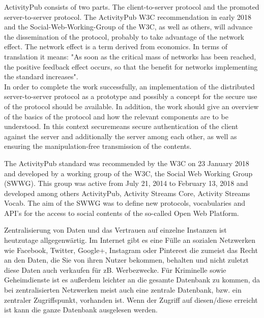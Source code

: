 {	ActivityPub consists of two parts. The client-to-server protocol and the promoted server-to-server protocol. The ActivityPub W3C recommendation in early 2018 and the Social-Web-Working-Group of the W3C, as well as others, will advance the dissemination of the protocol, probably to take advantage of the network effect. The network effect is a term derived from economics. In terms of translation it means: "As soon as the critical mass of networks has been reached, the positive feedback effect occurs, so that the benefit for networks implementing the standard increases".\\
	
	In order to complete the work successfully, an implementation of the distributed server-to-server protocol as a prototype and possibly a concept for the secure use of the protocol should be available. In addition, the work should give an overview of the basics of the protocol and how the relevant components are to be understood. In this context \glqq secure\grqq means secure authentication of the client against the server and additionally the server among each other, as well as ensuring the manipulation-free transmission of the contents.\\
	
	
	The ActivityPub\cite{activityPub} standard was recommended by the W3C on 23 January 2018 and developed by a working group of the W3C, the Social Web Working Group (SWWG)\cite{socialWg,pushSocialWeb}. This group was active from July 21, 2014 to February 13, 2018\cite{socialWg} and developed among others ActivityPub, Activity Streams Core\cite{activityStreamsCore}, Activity Streams Vocab\cite{activityStreamsVocabulary}. The aim of the SWWG was to define new protocols, vocabularies and API's for the access to social contents of the so-called Open Web Platform\cite{social-wg-charter}.

}{
	Zentralisierung von Daten und das Vertrauen auf einzelne Instanzen ist heutzutage allgegenwärtig. Im Internet gibt es eine Fülle an sozialen Netzwerken wie Facebook, Twitter, Google+, Instagram oder Pinterest die zumeist das Recht an den Daten, die Sie von ihren Nutzer bekommen, behalten und nicht zuletzt diese Daten auch verkaufen für zB. Werbezwecke. Für Kriminelle sowie Geheimdienste ist es außerdem leichter an die gesamte Datenbank zu kommen, da bei zentralisierten Netzwerken meist auch eine zentrale Datenbank, bzw. ein zentraler Zugriffspunkt, vorhanden ist. Wenn der Zugriff auf diesen/diese erreicht ist kann die ganze Datenbank ausgelesen werden.\\
		
}

